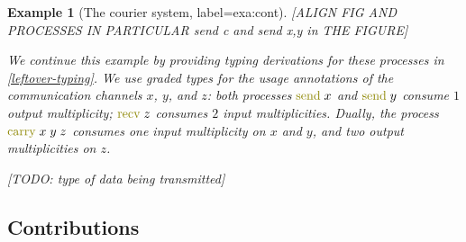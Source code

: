 \documentclass[sigplan,10pt,anonymous,review]{acmart}
\newtheorem{example}{Example}
\theoremstyle{definition}
\newcommand{\func}[1]{\textcolor{olive}{\operatorname{#1}}}
\begin{document}
\begin{example}[The courier system, label=exa:cont]
[ALIGN FIG AND PROCESSES IN PARTICULAR send c and send x,y in THE FIGURE]

We continue this example by providing typing derivations for these processes in \autoref{leftover-typing}.
We use graded types for the usage annotations of the communication channels $x$, $y$, and $z$: both processes $\func{send} \; x$ and $\func{send} \; y$ consume $1$ output multiplicity; $\func{recv} \; z$ consumes $2$ input multiplicities.
Dually, the process $\func{carry} \; x \; y \; z$ consumes one input multiplicity on $x$ and $y$, and two output multiplicities on $z$.

[TODO: type of data being transmitted]
\end{example}

\subsection{Contributions}
\end{document}
